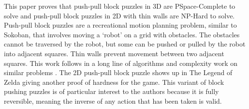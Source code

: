 
This paper proves that push-pull block puzzles in 3D are PSpace-Complete to solve and push-pull block puzzles in 2D with thin walls are NP-Hard to solve. Push-pull block puzzles are a recreational motion planning problem, similar to Sokoban, that involves moving a `robot' on a grid with obstacles. The obstacles cannot be traversed by the robot, but some can be pushed or pulled by the robot into adjacent squares. Thin walls prevent movement between two adjacent squares. This work follows in a long line of algorithms and complexity work on similar problems \cite{PushPull91}\cite{Push100}\cite{Push*00}\cite{PushPushk04}\cite{non-crossing01}\cite{DO92}\cite{Push2F02}\cite{Sokoban98}\cite{DZ96}\cite{Pull10}. The 2D push-pull block puzzle shows up in The Legend of Zelda giving another proof of hardness for the game\cite{NintendoFun2014}. This variant of block pushing puzzles is of particular interest to the authors because it is fully reversible, meaning the inverse of any action that has been taken is valid.
